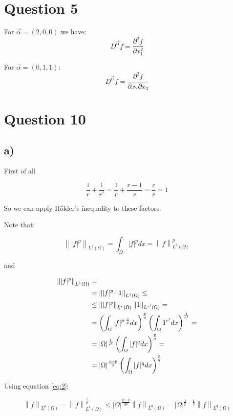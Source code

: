 \documentclass{article}
\newcommand{\normL}[2]{\left\lVert#1\right\rVert_{L^{#2}(\Omega)}}
\begin{document}
    \section*{Question 5}
    For $\vec{\alpha} = (2,0,0)$ we have:
    \[
        D^{\vec{\alpha}}f =\frac{\partial^2 f}{\partial x_1^2}
    \]

    For $\vec{\alpha} = (0,1,1)$:
    \[
        D^{\vec{\alpha}}f =\frac{\partial^2 f}{\partial x_2\partial x_3}
    \]

    \section*{Question 10}
    \subsection*{a)}

    First of all

    \[
        \frac{1}{r} + \frac{1}{r'} = \frac{1}{r} + \frac{r-1}{r} = \frac{r}{r} = 1
    \]

    So we can apply Hölder's inequality to these factors.

    Note that:

    \begin{equation}
        \label{eq:2}
        \normL{|f|^p}{1} = \int_\Omega |f|^p dx = \normL{f}{p}^p
    \end{equation}

    and

    \begin{align}
        \normL{|f|^p}{1} &= \notag \\
        &= \normL{|f|^p \cdot 1}{1} \le  \notag \\
        &\le \normL{|f|^p}{r} \normL{1}{r'} = \notag \\
        &= \left( \int_\Omega |f|^{p \cdot \frac{q}{p}} dx \right)^{\frac{p}{q}} \left( \int_\Omega 1^{r'} dx \right)^{\frac{1}{r'}} = \notag \\ 
        &= |\Omega|^{\frac{1}{r'}} \left( \int_\Omega |f|^q dx \right)^{\frac{p}{q}} =\notag \\
        &= |\Omega|^{\frac{q-p}{q}} \left( \int_\Omega |f|^q dx \right)^{\frac{p}{q}}\notag
    \end{align}

    Using equation \ref{eq:2}:

    \[
        \normL{f}{p} = \normL{f}{1}^{\frac{1}{p}} \le |\Omega|^{\frac{q-p}{qp}} \normL{f}{q} = |\Omega|^{\frac{1}{p} - \frac{1}{q}} \normL{f}{q}
    \]
\end{document}
